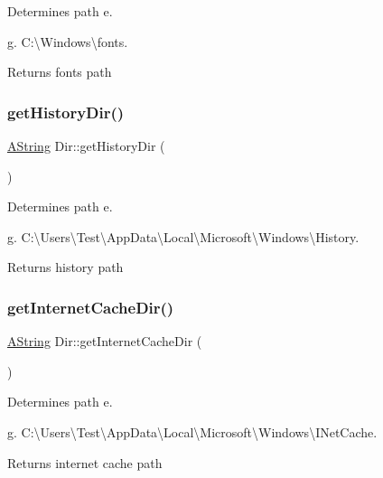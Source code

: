 Determines path e. 

g. C\+:\textbackslash{}\+Windows\textbackslash{}fonts. \begin{DoxyReturn}{Returns}
fonts path 
\end{DoxyReturn}
\mbox{\label{class_dir_a7101f975b15dceba8129052ade89976e}} 
\subsubsection{\texorpdfstring{getHistoryDir()}{getHistoryDir()}}
{\footnotesize\ttfamily \mbox{\hyperlink{class_a_string}{A\+String}} Dir\+::get\+History\+Dir (\begin{DoxyParamCaption}{ }\end{DoxyParamCaption})\hspace{0.3cm}{\ttfamily [static]}}



Determines path e. 

g. C\+:\textbackslash{}\+Users\textbackslash{}\+Test\textbackslash{}\+App\+Data\textbackslash{}\+Local\textbackslash{}\+Microsoft\textbackslash{}\+Windows\textbackslash{}\+History. \begin{DoxyReturn}{Returns}
history path 
\end{DoxyReturn}
\mbox{\label{class_dir_aa55905fc43ee09ec8d6d580bd765dc23}} 
\subsubsection{\texorpdfstring{getInternetCacheDir()}{getInternetCacheDir()}}
{\footnotesize\ttfamily \mbox{\hyperlink{class_a_string}{A\+String}} Dir\+::get\+Internet\+Cache\+Dir (\begin{DoxyParamCaption}{ }\end{DoxyParamCaption})\hspace{0.3cm}{\ttfamily [static]}}



Determines path e. 

g. C\+:\textbackslash{}\+Users\textbackslash{}\+Test\textbackslash{}\+App\+Data\textbackslash{}\+Local\textbackslash{}\+Microsoft\textbackslash{}\+Windows\textbackslash{}\+I\+Net\+Cache. \begin{DoxyReturn}{Returns}
internet cache path 
\end{DoxyReturn}
\mbox{\label{class_dir_aad9f92fd1d7857718746c41f14e56122}} 
